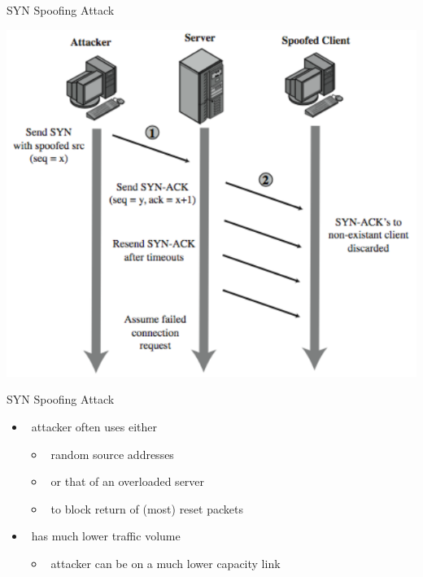 \documentclass{beamer}
\begin{document}
\begin{frame}{SYN Spoofing Attack}
  \begin{center}
    \includegraphics[width=0.8\linewidth]{syn_spoof}
  \end{center}
\end{frame}


\begin{frame}{SYN Spoofing Attack }
  \begin{itemize}
  \item  attacker often uses either 
    \begin{itemize}
    \item  random source addresses 
    \item  or that of an overloaded server 
    \item  to block return of (most) reset packets 
    \end{itemize}
  \item  has much lower traffic volume 
    \begin{itemize}
    \item  attacker can be on a much lower capacity link 
    \end{itemize}
  \end{itemize}
\end{frame}
\end{document}

